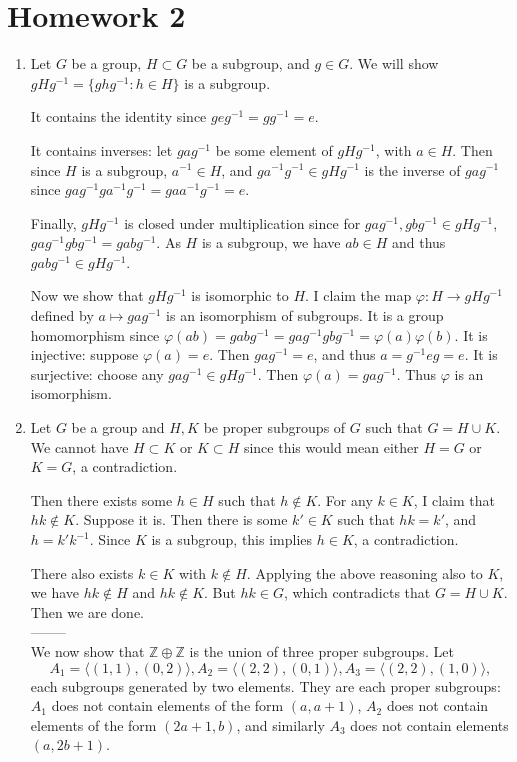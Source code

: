 \documentclass[11pt, reqno]{article}
\begin{document}
\topmargin=-40pt
\renewcommand{\headrulewidth}{1pt}
\renewcommand{\headsep}{20pt}
\thispagestyle{fancy}

\section*{Homework 2}

\begin{enumerate}
    \item Let $G$ be a group, $H \subset G$ be a subgroup, and $g \in G$. We will show
    $gHg^{-1} = \{ghg^{-1}: h \in H\}$ is a subgroup. 

    It contains the identity since $geg^{-1} = gg^{-1} = e$. 
    
    It contains inverses: let $gag^{-1}$
    be some element of $gHg^{-1}$, with $a \in H$. Then since $H$ is a subgroup, $a^{-1} \in H$, 
    and $ga^{-1}g^{-1} \in gHg^{-1}$ is the inverse of $gag^{-1}$ since $gag^{-1}ga^{-1}g^{-1}
    = gaa^{-1}g^{-1} = e$.

    Finally, $gHg^{-1}$ is closed under multiplication since for $gag^{-1}, gbg^{-1} \in gHg^{-1}$,
    $gag^{-1}gbg^{-1} = gabg^{-1}$. As $H$ is a subgroup, we have $ab \in H$ and thus $gabg^{-1} \in gHg^{-1}$.

    Now we show that $gHg^{-1}$ is isomorphic to $H$. I claim the map $\varphi: H \rightarrow gHg^{-1}$
    defined by $a \mapsto gag^{-1}$ is an isomorphism of subgroups. It is a group homomorphism
    since $\varphi(ab) = gabg^{-1} = gag^{-1}gbg^{-1} = \varphi(a)\varphi(b)$. It is injective: 
    suppose $\varphi(a) = e$. Then $gag^{-1} = e$, and thus $a = g^{-1}eg = e$. It is surjective: 
    choose any $gag^{-1} \in gHg^{-1}$. Then $\varphi(a) = gag^{-1}$. Thus $\varphi$ is an isomorphism.

    \item Let $G$ be a group and $H, K$ be proper subgroups of $G$ such that $G = H \cup K$. 
    We cannot have $H \subset K$ or $K \subset H$ since this would mean either $H = G$ or $K = G$,
    a contradiction. 

    Then there exists some $h \in H$ such that $h \notin K$. For any $k \in K$, I claim that 
    $hk \notin K$. Suppose it is. Then there is some $k' \in K$ such that $hk = k'$, and $h = k'k^{-1}$.
    Since $K$ is a subgroup, this implies $h \in K$, a contradiction. 

    There also exists $k \in K$ with $k \notin H$. Applying the above reasoning also to $K$, we have $hk \notin H$ 
    and $hk \notin K$. But $hk \in G$, which contradicts that $G = H \cup K$. Then we are done.\\
    --------\\
    We now show that $\mathbb{Z}\oplus\mathbb{Z}$ is the union of three proper subgroups. 
    Let 
    \[
    A_1 = \langle(1,1), (0,2)\rangle, A_2 = \langle(2,2), (0,1)\rangle, 
    A_3 = \langle(2,2), (1,0)\rangle,
    \]
    each subgroups generated by two elements. They are each proper subgroups: 
    $A_1$ does not contain elements of the form $(a,a+1)$, $A_2$ does not contain
    elements of the form $(2a + 1, b)$, and similarly $A_3$ does not contain elements
    $(a, 2b + 1)$. 
    

\end{enumerate}
\end{document}
